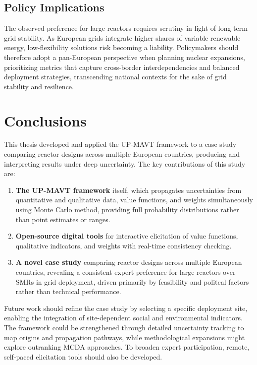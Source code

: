 \documentclass[11pt,a4paper,twocolumn]{article}
\begin{document}
\subsection{Policy Implications}

The observed preference for large reactors requires scrutiny in light of long-term grid stability. As European grids integrate higher shares of variable renewable energy, low-flexibility solutions risk becoming a liability. Policymakers should therefore adopt a pan-European perspective when planning nuclear expansions, prioritizing metrics that capture cross-border interdependencies and balanced deployment strategies, transcending national contexts for the sake of grid stability and resilience.

\section{Conclusions}
\label{sec:conclusions}
This thesis developed and applied the UP-MAVT framework to a case study comparing reactor designs across multiple European countries, producing and interpreting results under deep uncertainty. The key contributions of this study are:
\begin{enumerate}
    \item \textbf{The UP-MAVT framework} itself, which propagates uncertainties from quantitative and qualitative data, value functions, and weights simultaneously using Monte Carlo method, providing full probability distributions rather than point estimates or ranges.
    \item \textbf{Open-source digital tools} for interactive elicitation of value functions, qualitative indicators, and weights with real-time consistency checking.
    \item \textbf{A novel case study} comparing reactor designs across multiple European countries, revealing a consistent expert preference for large reactors over SMRs in grid deployment, driven primarily by feasibility and politcal factors rather than technical performance.
\end{enumerate}

Future work should refine the case study by selecting a specific deployment site, enabling the integration of site-dependent social and environmental indicators. The framework could be strengthened through detailed uncertainty tracking to map origins and propagation pathways, while methodological expansions might explore outranking MCDA approaches. To broaden expert participation, remote, self-paced elicitation tools should also be developed.
\end{document}
